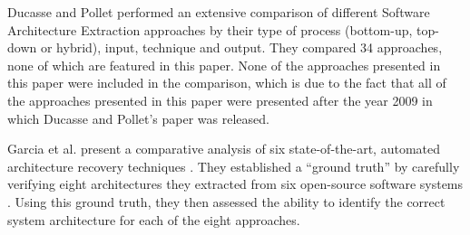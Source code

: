 Ducasse and Pollet \cite{Ducasse2009} performed an extensive comparison of different Software Architecture Extraction approaches by their type of process (bottom-up, top-down or hybrid), input, technique and output.
They compared 34 approaches, none of which are featured in this paper.
None of the approaches presented in this paper were included in the comparison, which is due to the fact that all of the approaches presented in this paper were presented after the year 2009 in which Ducasse and Pollet's paper was released.

Garcia et al. present a comparative analysis of six state-of-the-art, automated architecture recovery techniques \cite{Garcia2013comparative}.
They established a ``ground truth'' by carefully verifying eight architectures they extracted from six open-source software systems \cite{Garcia2013comparative}.
Using this ground truth, they then assessed the ability to identify the correct system architecture for each of the eight approaches.